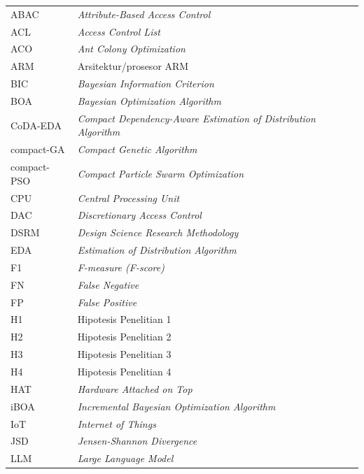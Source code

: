 \begin{longtable}{
    @{}
    >{\raggedright\arraybackslash}p{3cm}
    >{\raggedright\arraybackslash}p{7.5cm}
    >{\centering\arraybackslash}p{3.0cm}
    @{}
}
ABAC & \textit{Attribute-Based Access Control} & \pageref{first:abac} \\
ACL & \textit{Access Control List} & \pageref{first:acl} \\
ACO & \textit{Ant Colony Optimization} & \pageref{first:aco} \\
ARM & Arsitektur/prosesor ARM & \pageref{first:arm} \\
BIC & \textit{Bayesian Information Criterion} & \pageref{first:bic} \\
BOA & \textit{Bayesian Optimization Algorithm} & \pageref{first:boa} \\
CoDA-EDA & \textit{Compact Dependency-Aware Estimation of Distribution Algorithm} & \pageref{first:coda-eda} \\
compact-GA & \textit{Compact Genetic Algorithm} & \pageref{first:compact-ga} \\
compact-PSO & \textit{Compact Particle Swarm Optimization} & \pageref{first:compact-pso} \\
CPU & \textit{Central Processing Unit} & \pageref{first:cpu} \\
DAC & \textit{Discretionary Access Control} & \pageref{first:dac} \\
DSRM & \textit{Design Science Research Methodology} & \pageref{first:dsrm} \\
EDA & \textit{Estimation of Distribution Algorithm} & \pageref{first:eda} \\
F1 & \textit{F-measure (F-score)} & \pageref{first:f1} \\
FN & \textit{False Negative} & \pageref{first:fn} \\
FP & \textit{False Positive} & \pageref{first:fp} \\
H1 & Hipotesis Penelitian 1 & \pageref{first:h1} \\
H2 & Hipotesis Penelitian 2 & \pageref{first:h2} \\
H3 & Hipotesis Penelitian 3 & \pageref{first:h3} \\
H4 & Hipotesis Penelitian 4 & \pageref{first:h4} \\
HAT & \textit{Hardware Attached on Top} & \pageref{first:hat} \\
iBOA & \textit{Incremental Bayesian Optimization Algorithm} & \pageref{first:iboa} \\
IoT & \textit{Internet of Things} & \pageref{first:iot} \\
JSD & \textit{Jensen-Shannon Divergence} & \pageref{first:jsd} \\
LLM & \textit{Large Language Model} & \pageref{first:llm} \\

\end{longtable}
